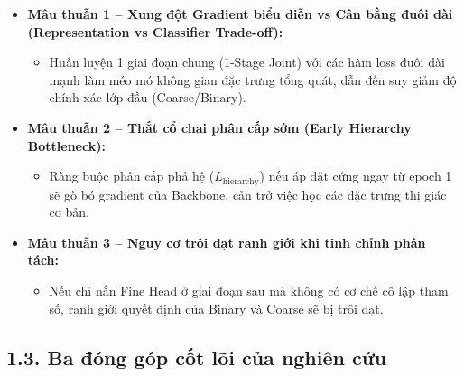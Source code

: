\documentclass[
  10pt,
  a4paper,
  twocolumn]{article}
\providecommand{\tightlist}{%
  \setlength{\itemsep}{0pt}\setlength{\parskip}{0pt}}
\begin{document}
\begin{itemize}
\tightlist
\item
  \textbf{Mâu thuẫn 1 -- Xung đột Gradient biểu diễn vs Cân bằng đuôi
  dài (Representation vs Classifier Trade-off):}

  \begin{itemize}
  \tightlist
  \item
    Huấn luyện 1 giai đoạn chung (1-Stage Joint) với các hàm loss đuôi
    dài mạnh làm méo mó không gian đặc trưng tổng quát, dẫn đến suy giảm
    độ chính xác lớp đầu (Coarse/Binary).
  \end{itemize}
\item
  \textbf{Mâu thuẫn 2 -- Thắt cổ chai phân cấp sớm (Early Hierarchy
  Bottleneck):}

  \begin{itemize}
  \tightlist
  \item
    Ràng buộc phân cấp phả hệ (\(L_{\text{hierarchy}}\)) nếu áp đặt cứng
    ngay từ epoch 1 sẽ gò bó gradient của Backbone, cản trở việc học các
    đặc trưng thị giác cơ bản.
  \end{itemize}
\item
  \textbf{Mâu thuẫn 3 -- Nguy cơ trôi dạt ranh giới khi tinh chỉnh phân
  tách:}

  \begin{itemize}
  \tightlist
  \item
    Nếu chỉ nắn Fine Head ở giai đoạn sau mà không có cơ chế cô lập tham
    số, ranh giới quyết định của Binary và Coarse sẽ bị trôi dạt.
  \end{itemize}
\end{itemize}

\subsection{1.3. Ba đóng góp cốt lõi của nghiên
cứu}\label{ba-ux111uxf3ng-guxf3p-cux1ed1t-luxf5i-cux1ee7a-nghiuxean-cux1ee9u}
\end{document}
